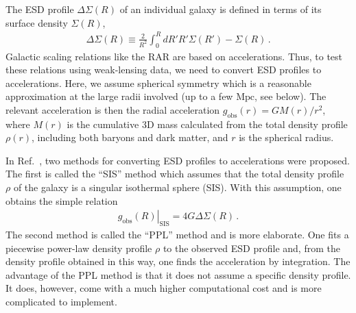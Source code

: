 \documentclass[a4paper,11pt]{article}
\begin{document}
The ESD profile $\Delta \Sigma(R)$ of an individual galaxy is defined in terms of its surface density $\Sigma(R)$,
\begin{align}
 \label{eq:esd}
 \Delta \Sigma(R) \equiv \frac{2}{R^2} \int_0^R dR' R' \Sigma(R') - \Sigma(R) \,.
\end{align}
Galactic scaling relations like the RAR are based on accelerations.
Thus, to test these relations using weak-lensing data, we need to convert ESD profiles to accelerations.
Here, we assume spherical symmetry which is a reasonable approximation at the large radii involved (up to a few $\mathrm{Mpc}$, see below).
The relevant acceleration is then the radial acceleration $g_{\mathrm{obs}}(r) = G M(r)/r^2$, where $M(r)$ is the cumulative 3D mass calculated from the total density profile $\rho(r)$, including both baryons and dark matter, and $r$ is the spherical radius.


In Ref.~\cite{Brouwer2021}, two methods for converting ESD profiles to accelerations were proposed.
The first is called the ``SIS'' method which assumes that the total density profile $\rho$ of the galaxy is a singular isothermal sphere (SIS).
With this assumption, one obtains the simple relation
\begin{align}
 \label{eq:gobs_sis}
 \left. g_{\mathrm{obs}}(R) \right|_{\mathrm{SIS}} = 4 G \Delta \Sigma(R) \,.
\end{align}
The second method is called the ``PPL'' method and is more elaborate.
One fits a piecewise power-law density profile $\rho$ to the observed ESD profile and, from the density profile obtained in this way, one finds the acceleration by integration.
The advantage of the PPL method is that it does not assume a specific density profile.
It does, however, come with a much higher computational cost and is more complicated to implement.
\end{document}
